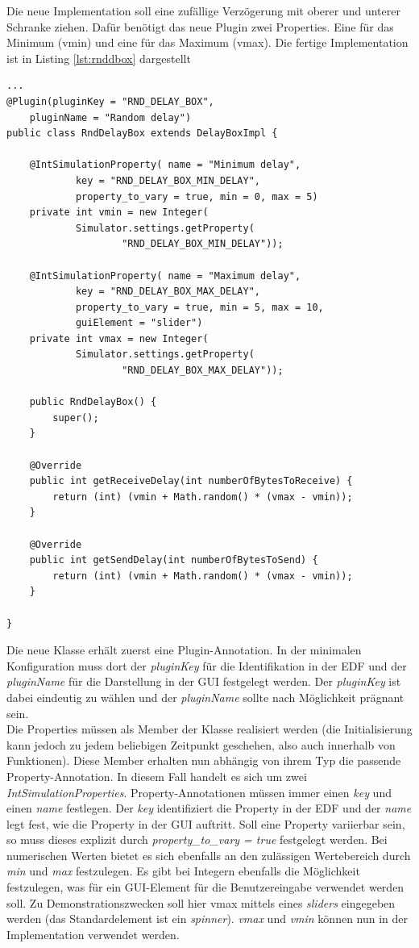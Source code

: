 \documentclass[a4paper, 11pt]{article} %
\begin{document}
Die neue Implementation soll eine zufällige Verzögerung mit oberer und unterer Schranke ziehen. Dafür benötigt das neue Plugin zwei Properties. Eine für das Minimum (vmin) und eine für das Maximum (vmax). Die fertige Implementation ist in Listing \ref{lst:rnddbox} dargestellt\\

\begin{lstlisting}[caption={RndDelayBox.java}, label=lst:rnddbox]
...
@Plugin(pluginKey = "RND_DELAY_BOX", 
	pluginName = "Random delay")
public class RndDelayBox extends DelayBoxImpl {
	
	@IntSimulationProperty(	name = "Minimum delay", 
			key = "RND_DELAY_BOX_MIN_DELAY", 
			property_to_vary = true, min = 0, max = 5)
	private int vmin = new Integer(
			Simulator.settings.getProperty(
					"RND_DELAY_BOX_MIN_DELAY"));
	
	@IntSimulationProperty(	name = "Maximum delay", 
			key = "RND_DELAY_BOX_MAX_DELAY",
			property_to_vary = true, min = 5, max = 10, 
			guiElement = "slider")
	private int vmax = new Integer(
			Simulator.settings.getProperty(
					"RND_DELAY_BOX_MAX_DELAY"));
	
	public RndDelayBox() {
		super();
	}
	
	@Override
	public int getReceiveDelay(int numberOfBytesToReceive) {
		return (int) (vmin + Math.random() * (vmax - vmin));
	}

	@Override
	public int getSendDelay(int numberOfBytesToSend) {
		return (int) (vmin + Math.random() * (vmax - vmin));
	}

}
\end{lstlisting}

Die neue Klasse erhält zuerst eine Plugin-Annotation. In der minimalen Konfiguration muss dort der \emph{pluginKey} für die Identifikation in der EDF und der \emph{pluginName} für die Darstellung in der GUI festgelegt werden. Der \emph{pluginKey} ist dabei eindeutig zu wählen und der \emph{pluginName} sollte nach Möglichkeit prägnant sein.\\

Die Properties müssen als Member der Klasse realisiert werden (die Initialisierung kann jedoch zu jedem beliebigen Zeitpunkt geschehen, also auch innerhalb von Funktionen). Diese Member erhalten nun abhängig von ihrem Typ die passende Property-Annotation. In diesem Fall handelt es sich um zwei \emph{IntSimulationProperties}. Property-Annotationen müssen immer einen \emph{key} und einen \emph{name} festlegen. Der \emph{key} identifiziert die Property in der EDF und der \emph{name} legt fest, wie die Property in der GUI auftritt. Soll eine Property variierbar sein, so muss dieses explizit durch \emph{property\_to\_vary = true} festgelegt werden. Bei numerischen Werten bietet es sich ebenfalls an den zulässigen Wertebereich durch \emph{min} und \emph{max} festzulegen. Es gibt bei Integern ebenfalls die Möglichkeit festzulegen, was für ein GUI-Element für die Benutzereingabe verwendet werden soll. Zu Demonstrationszwecken soll hier vmax mittels eines \emph{sliders} eingegeben werden (das Standardelement ist ein \emph{spinner}). \emph{vmax} und \emph{vmin} können nun in der Implementation verwendet werden.\\
\end{document}
